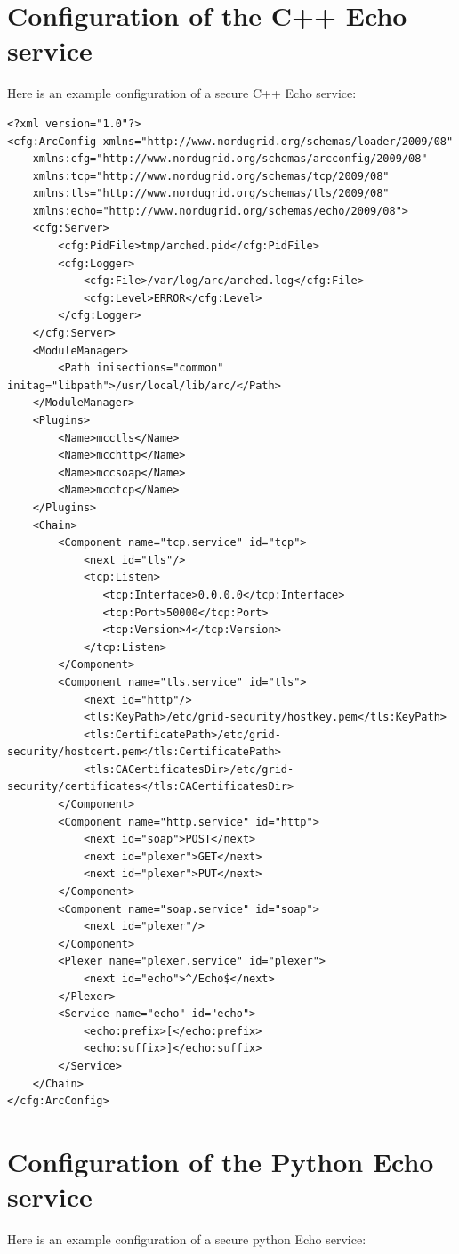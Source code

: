 \documentclass{article}
\begin{document}
\section{Configuration of the C++ Echo service} %
\label{sec:configuration}
Here is an example configuration of a secure C++ Echo service:

\begin{verbatim}
<?xml version="1.0"?>
<cfg:ArcConfig xmlns="http://www.nordugrid.org/schemas/loader/2009/08"
	xmlns:cfg="http://www.nordugrid.org/schemas/arcconfig/2009/08"
	xmlns:tcp="http://www.nordugrid.org/schemas/tcp/2009/08"
	xmlns:tls="http://www.nordugrid.org/schemas/tls/2009/08"
	xmlns:echo="http://www.nordugrid.org/schemas/echo/2009/08">
    <cfg:Server>
        <cfg:PidFile>tmp/arched.pid</cfg:PidFile>
        <cfg:Logger>
            <cfg:File>/var/log/arc/arched.log</cfg:File>
            <cfg:Level>ERROR</cfg:Level>
        </cfg:Logger>
    </cfg:Server>
    <ModuleManager>
        <Path inisections="common" initag="libpath">/usr/local/lib/arc/</Path>
    </ModuleManager>
    <Plugins>
        <Name>mcctls</Name>
        <Name>mcchttp</Name>
        <Name>mccsoap</Name>
        <Name>mcctcp</Name>
    </Plugins>
    <Chain>
        <Component name="tcp.service" id="tcp">
            <next id="tls"/>
            <tcp:Listen>
               <tcp:Interface>0.0.0.0</tcp:Interface>
               <tcp:Port>50000</tcp:Port>
               <tcp:Version>4</tcp:Version>
            </tcp:Listen>
        </Component>
        <Component name="tls.service" id="tls">
            <next id="http"/>
            <tls:KeyPath>/etc/grid-security/hostkey.pem</tls:KeyPath>
            <tls:CertificatePath>/etc/grid-security/hostcert.pem</tls:CertificatePath>
            <tls:CACertificatesDir>/etc/grid-security/certificates</tls:CACertificatesDir>
        </Component>
        <Component name="http.service" id="http">
            <next id="soap">POST</next>
            <next id="plexer">GET</next>
            <next id="plexer">PUT</next>
        </Component>
        <Component name="soap.service" id="soap">
            <next id="plexer"/>
        </Component>
        <Plexer name="plexer.service" id="plexer">
            <next id="echo">^/Echo$</next>
        </Plexer>
        <Service name="echo" id="echo">
            <echo:prefix>[</echo:prefix>
            <echo:suffix>]</echo:suffix>
        </Service>
    </Chain>
</cfg:ArcConfig>
\end{verbatim}

\section{Configuration of the Python Echo service} %
\label{sec:configuration_of_the_python_echo_service}
Here is an example configuration of a secure python Echo service:
\end{document}
